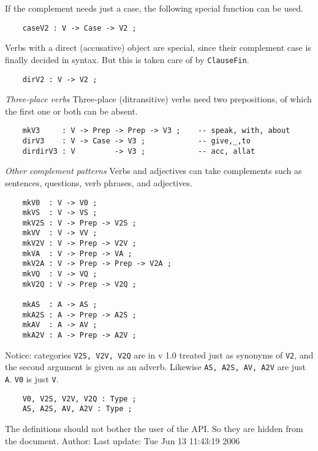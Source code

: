 \documentclass[11pt,a4paper]{article}
\newcommand{\subsubsubsection}[1]{\textit{#1}}
\begin{document}
If the complement needs just a case, the following special function can be used.

\begin{verbatim}
    caseV2 : V -> Case -> V2 ;
\end{verbatim}

Verbs with a direct (accusative) object
are special, since their complement case is finally decided in syntax.
But this is taken care of by \texttt{ClauseFin}.

\begin{verbatim}
    dirV2 : V -> V2 ;
\end{verbatim}

\subsubsubsection{Three-place verbs}
Three-place (ditransitive) verbs need two prepositions, of which
the first one or both can be absent.

\begin{verbatim}
    mkV3     : V -> Prep -> Prep -> V3 ;    -- speak, with, about
    dirV3    : V -> Case -> V3 ;            -- give,_,to
    dirdirV3 : V         -> V3 ;            -- acc, allat
\end{verbatim}

\subsubsubsection{Other complement patterns}
Verbs and adjectives can take complements such as sentences,
questions, verb phrases, and adjectives.

\begin{verbatim}
    mkV0  : V -> V0 ;
    mkVS  : V -> VS ;
    mkV2S : V -> Prep -> V2S ;
    mkVV  : V -> VV ;
    mkV2V : V -> Prep -> V2V ;
    mkVA  : V -> Prep -> VA ;
    mkV2A : V -> Prep -> Prep -> V2A ;
    mkVQ  : V -> VQ ;
    mkV2Q : V -> Prep -> V2Q ;
  
    mkAS  : A -> AS ;
    mkA2S : A -> Prep -> A2S ;
    mkAV  : A -> AV ;
    mkA2V : A -> Prep -> A2V ;
\end{verbatim}

Notice: categories \texttt{V2S, V2V, V2Q} are in v 1.0 treated
just as synonyms of \texttt{V2}, and the second argument is given
as an adverb. Likewise \texttt{AS, A2S, AV, A2V} are just \texttt{A}.
\texttt{V0} is just \texttt{V}.

\begin{verbatim}
    V0, V2S, V2V, V2Q : Type ;
    AS, A2S, AV, A2V : Type ;
\end{verbatim}

The definitions should not bother the user of the API. So they are
hidden from the document.
Author: 
Last update: Tue Jun 13 11:43:19 2006
\end{document}
